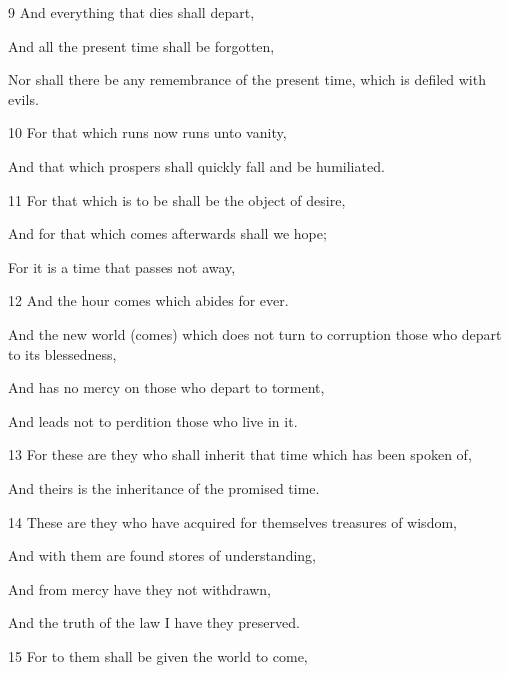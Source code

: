 \par 9 And everything that dies shall depart,

\par And all the present time shall be forgotten,

\par Nor shall there be any remembrance of the present time, which is defiled with evils.

\par 10 For that which runs now runs unto vanity,

\par And that which prospers shall quickly fall and be humiliated.

\par 11 For that which is to be shall be the object of desire,

\par And for that which comes afterwards shall we hope;

\par For it is a time that passes not away,

\par 12 And the hour comes which abides for ever.

\par And the new world (comes) which does not turn to corruption those who depart to its blessedness,

\par And has no mercy on those who depart to torment,

\par And leads not to perdition those who live in it.

\par 13 For these are they who shall inherit that time which has been spoken of,

\par And theirs is the inheritance of the promised time.

\par 14 These are they who have acquired for themselves treasures of wisdom,

\par And with them are found stores of understanding,

\par And from mercy have they not withdrawn,

\par And the truth of the law I have they preserved.

\par 15 For to them shall be given the world to come,

